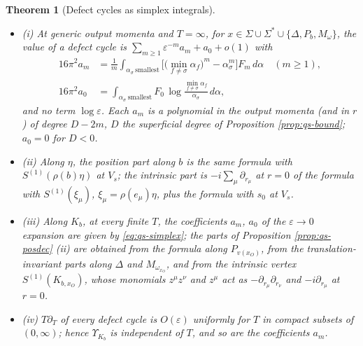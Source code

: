 \documentclass[11pt]{article}
\numberwithin{equation}{section}
\theoremstyle{plain}
\newtheorem{theorem}{Theorem}[section]
\theoremstyle{definition}
\begin{document}
\begin{theorem}[Defect cycles as simplex integrals]
\label{thm:qs-simplex}
\begin{itemize}
\item (i) At generic output momenta and $T=\infty$, for $x\in\Sigma\cup\Sigma^*\cup\{\Delta,P_b,M_\omega\}$, the value of a defect cycle is $\sum_{m\ge1}\varepsilon^{-m}a_m+a_0+o(1)$ with
\begin{equation}
\begin{aligned}
16\pi^2a_m&=\frac1m\int_{\alpha_\sigma\ \text{smallest}}\Big[\big(\min_{f\ne\sigma}\alpha_f\big)^m-\alpha_\sigma^m\Big]F_m\,d\alpha\quad(m\ge1),\\
16\pi^2a_0&=\int_{\alpha_\sigma\ \text{smallest}}F_0\,\log\frac{\min_{f\ne\sigma}\alpha_f}{\alpha_\sigma}\,d\alpha ,
\end{aligned}
\label{eq:qs-simplex}
\end{equation}
and no term $\log\varepsilon$. Each $a_m$ is a polynomial in the output momenta (and in $r$) of degree $D-2m$, $D$ the superficial degree of Proposition \ref{prop:qs-bound}; $a_0=0$ for $D<0$.
\item (ii) Along $\eta$, the position part along $b$ is the same formula with $S^{(1)}(\rho(b)\eta)$ at $V_s$; the intrinsic part is $-i\sum_\mu\partial_{r_\mu}$ at $r=0$ of the formula with $S^{(1)}(\xi_\mu)$, $\xi_\mu=\rho(e_\mu)\eta$, plus the formula with $s_0$ at $V_s$.
\item (iii) Along $K_b$, at every finite $T$, the coefficients $a_m$, $a_0$ of the $\varepsilon\to0$ expansion are given by \eqref{eq:qs-simplex}; the parts of Proposition \ref{prop:qs-posdec} (ii) are obtained from the formula along $P_{v(x_O)}$, from the translation-invariant parts along $\Delta$ and $M_{\omega_{x_O}}$, and from the intrinsic vertex $S^{(1)}(K_{b,x_O})$, whose monomials $z^\mu z^\nu$ and $z^\mu$ act as $-\partial_{r_\mu}\partial_{r_\nu}$ and $-i\partial_{r_\mu}$ at $r=0$.
\item (iv) $T\partial_T$ of every defect cycle is $O(\varepsilon)$ uniformly for $T$ in compact subsets of $(0,\infty)$; hence $\Upsilon_{K_b}$ is independent of $T$, and so are the coefficients $a_m$.
\end{itemize}
\end{theorem}
\end{document}
